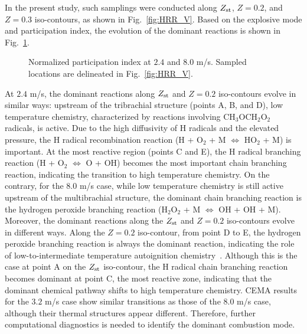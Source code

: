 \documentclass[review,3p,times]{elsarticle}
\begin{document}
In the present study, such samplings were conducted along $Z_{\rm st}$, $Z = 0.2$, and $Z = 0.3$ iso-contours, as shown in Fig.~\ref{fig:HRR_V}.  Based on the explosive mode and participation index, the evolution of the dominant reactions is shown in Fig.~\ref{fig:CEMA_V}.

\begin{figure}
  \centering
  \scriptsize
  \resizebox{1.0\textwidth}{!}{}
  \resizebox{1.0\textwidth}{!}{}
  \normalsize
  \caption{Normalized participation index at $2.4$ and $8.0$ m/s.  Sampled locations are delineated in Fig.~\ref{fig:HRR_V}.}
  \label{fig:CEMA_V}
\end{figure}

At $2.4$ m/s, the dominant reactions along $Z_{\rm st}$ and $Z = 0.2$ iso-contours evolve in similar ways: upstream of the tribrachial structure (points A, B, and D), low temperature chemistry, characterized by reactions involving CH$_3$OCH$_2$O$_2$ radicals, is active.  Due to the high diffusivity of H radicals and the elevated pressure, the H radical recombination reaction (H + O$_2$ + M $\Longleftrightarrow$ HO$_2$ + M) is important.  At the most reactive region (points C and E), the H radical branching reaction (H + O$_2$ $\Longleftrightarrow$ O + OH) becomes the most important chain branching reaction, indicating the transition to high temperature chemistry.  On the contrary, for the $8.0$ m/s case, while low temperature chemistry is still active upstream of the multibrachial structure, the dominant chain branching reaction is the hydrogen peroxide branching reaction (H$_2$O$_2$ + M $\Longleftrightarrow$ OH + OH + M).  Moreover, the dominant reactions along the $Z_{\rm st}$ and $Z = 0.2$ iso-contours evolve in different ways.  Along the $Z = 0.2$ iso-contour, from point D to E, the hydrogen peroxide branching reaction is always the dominant reaction, indicating the role of low-to-intermediate temperature autoignition chemistry~\cite{westbrook00}.  Although this is the case at point A on the $Z_{\rm st}$ iso-contour, the H radical chain branching reaction becomes dominant at point C, the most reactive zone, indicating that the dominant chemical pathway shifts to high temperature chemistry.  CEMA results for the $3.2$ m/s case show similar transitions as those of the $8.0$ m/s case, although their thermal structures appear different.  Therefore, further computational diagnostics is needed to identify the dominant combustion mode.   
\end{document}
